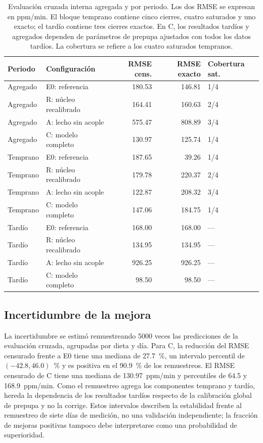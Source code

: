 \begin{table}[htbp]
  \centering
  \footnotesize
  \setlength{\tabcolsep}{3pt}
  \caption{Evaluación cruzada interna agregada y por periodo. Los dos RMSE se expresan en ppm/min. El bloque temprano contiene cinco cierres, cuatro saturados y uno exacto; el tardío contiene tres cierres exactos. En C, los resultados tardíos y agregados dependen de parámetros de prepupa ajustados con todos los datos tardíos. La cobertura se refiere a los cuatro saturados tempranos.}
  \label{tab:cv}
  \begin{tabular}{llrrl}
    \toprule
    Periodo & Configuración & RMSE cens. & RMSE exacto & Cobertura sat. \\
    \midrule
    Agregado & E0: referencia & 180.53 & 146.81 & 1/4 \\
    Agregado & R: núcleo recalibrado & 164.41 & 160.63 & 2/4 \\
    Agregado & A: lecho sin acople & 575.47 & 808.89 & 3/4 \\
    Agregado & C: modelo completo & 130.97 & 125.74 & 1/4 \\
    \midrule
    Temprano & E0: referencia & 187.65 & 39.26 & 1/4 \\
    Temprano & R: núcleo recalibrado & 179.78 & 220.37 & 2/4 \\
    Temprano & A: lecho sin acople & 122.87 & 208.32 & 3/4 \\
    Temprano & C: modelo completo & 147.06 & 184.75 & 1/4 \\
    \midrule
    Tardío & E0: referencia & 168.00 & 168.00 & --- \\
    Tardío & R: núcleo recalibrado & 134.95 & 134.95 & --- \\
    Tardío & A: lecho sin acople & 926.25 & 926.25 & --- \\
    Tardío & C: modelo completo & 98.50 & 98.50 & --- \\
    \bottomrule
  \end{tabular}
\end{table}

\subsection{Incertidumbre de la mejora}
\label{sec:bootstrap}

La incertidumbre se estimó remuestreando 5000 veces las predicciones de la evaluación cruzada, agrupadas por dieta y día. Para C, la reducción del RMSE censurado frente a E0 tiene una mediana de 27.7~\%, un intervalo percentil de $(-42.8, 46.0)$~\% y es positiva en el 90.9~\% de los remuestreos. El RMSE censurado de C tiene una mediana de 130.97~ppm/min y percentiles de 64.5 y 168.9~ppm/min. Como el remuestreo agrega los componentes temprano y tardío, hereda la dependencia de los resultados tardíos respecto de la calibración global de prepupa y no la corrige. Estos intervalos describen la estabilidad frente al remuestreo de siete días de medición, no una validación independiente; la fracción de mejoras positivas tampoco debe interpretarse como una probabilidad de superioridad.


